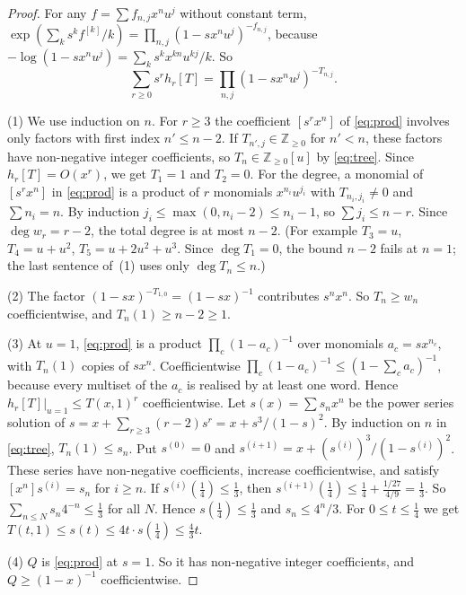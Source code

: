 \documentclass[11pt]{amsart}
\theoremstyle{definition}
\theoremstyle{remark}
\numberwithin{equation}{section}
\newcommand{\ZZ}{\mathbb{Z}}
\begin{document}
\begin{proof}
For any \(f=\sum f_{n,j}x^nu^j\) without constant term, \(\exp(\sum_k s^kf^{[k]}/k)=\prod_{n,j}(1-sx^nu^j)^{-f_{n,j}}\), because \(-\log(1-sx^nu^j)=\sum_ks^kx^{kn}u^{kj}/k\). So
\begin{equation}\label{eq:prod}
\sum_{r\ge0}s^rh_r[T]=\prod_{n,j}(1-sx^nu^j)^{-T_{n,j}}.
\end{equation}

(1) We use induction on \(n\). For \(r\ge3\) the coefficient \([s^rx^n]\) of \eqref{eq:prod} involves only factors with first index \(n'\le n-2\). If \(T_{n',j}\in\ZZ_{\ge0}\) for \(n'<n\), these factors have non-negative integer coefficients, so \(T_n\in\ZZ_{\ge0}[u]\) by \eqref{eq:tree}. Since \(h_r[T]=O(x^r)\), we get \(T_1=1\) and \(T_2=0\). For the degree, a monomial of \([s^rx^n]\) in \eqref{eq:prod} is a product of \(r\) monomials \(x^{n_i}u^{j_i}\) with \(T_{n_i,j_i}\ne0\) and \(\sum n_i=n\). By induction \(j_i\le\max(0,n_i-2)\le n_i-1\), so \(\sum j_i\le n-r\). Since \(\deg w_r=r-2\), the total degree is at most \(n-2\). (For example \(T_3=u\), \(T_4=u+u^2\), \(T_5=u+2u^2+u^3\). Since \(\deg T_1=0\), the bound \(n-2\) fails at \(n=1\); the last sentence of~(1) uses only \(\deg T_n\le n\).)

(2) The factor \((1-sx)^{-T_{1,0}}=(1-sx)^{-1}\) contributes \(s^nx^n\). So \(T_n\ge w_n\) coefficientwise, and \(T_n(1)\ge n-2\ge1\).

(3) At \(u=1\), \eqref{eq:prod} is a product \(\prod_c(1-a_c)^{-1}\) over monomials \(a_c=sx^{n_c}\), with \(T_n(1)\) copies of \(sx^n\). Coefficientwise \(\prod_c(1-a_c)^{-1}\le(1-\sum_ca_c)^{-1}\), because every multiset of the \(a_c\) is realised by at least one word. Hence \(h_r[T]|_{u=1}\le T(x,1)^r\) coefficientwise. Let \(s(x)=\sum s_nx^n\) be the power series solution of \(s=x+\sum_{r\ge3}(r-2)s^r=x+s^3/(1-s)^2\). By induction on \(n\) in \eqref{eq:tree}, \(T_n(1)\le s_n\). Put \(s^{(0)}=0\) and \(s^{(i+1)}=x+(s^{(i)})^3/(1-s^{(i)})^2\). These series have non-negative coefficients, increase coefficientwise, and satisfy \([x^n]s^{(i)}=s_n\) for \(i\ge n\). If \(s^{(i)}(\frac14)\le\frac13\), then \(s^{(i+1)}(\frac14)\le\frac14+\frac{1/27}{4/9}=\frac13\). So \(\sum_{n\le N}s_n4^{-n}\le\frac13\) for all \(N\). Hence \(s(\frac14)\le\frac13\) and \(s_n\le4^n/3\). For \(0\le t\le\frac14\) we get \(T(t,1)\le s(t)\le4t\cdot s(\frac14)\le\frac43t\).

(4) \(Q\) is \eqref{eq:prod} at \(s=1\). So it has non-negative integer coefficients, and \(Q\ge(1-x)^{-1}\) coefficientwise.
\end{proof}
\end{document}
